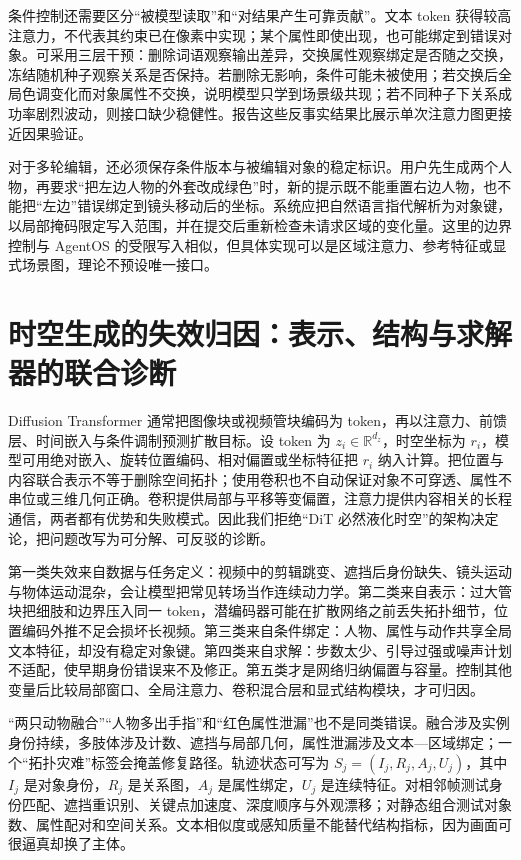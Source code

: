 条件控制还需要区分“被模型读取”和“对结果产生可靠贡献”。文本 token 获得较高注意力，不代表其约束已在像素中实现；某个属性即使出现，也可能绑定到错误对象。可采用三层干预：删除词语观察输出差异，交换属性观察绑定是否随之交换，冻结随机种子观察关系是否保持。若删除无影响，条件可能未被使用；若交换后全局色调变化而对象属性不交换，说明模型只学到场景级共现；若不同种子下关系成功率剧烈波动，则接口缺少稳健性。报告这些反事实结果比展示单次注意力图更接近因果验证。

对于多轮编辑，还必须保存条件版本与被编辑对象的稳定标识。用户先生成两个人物，再要求“把左边人物的外套改成绿色”时，新的提示既不能重置右边人物，也不能把“左边”错误绑定到镜头移动后的坐标。系统应把自然语言指代解析为对象键，以局部掩码限定写入范围，并在提交后重新检查未请求区域的变化量。这里的边界控制与 AgentOS 的受限写入相似，但具体实现可以是区域注意力、参考特征或显式场景图，理论不预设唯一接口。

\section{时空生成的失效归因：表示、结构与求解器的联合诊断}
\label{sec:dit_pathology_confounding}

Diffusion Transformer 通常把图像块或视频管块编码为 token，再以注意力、前馈层、时间嵌入与条件调制预测扩散目标。设 token 为 $z_i\in\mathbb{R}^{d_z}$，时空坐标为 $r_i$，模型可用绝对嵌入、旋转位置编码、相对偏置或坐标特征把 $r_i$ 纳入计算。把位置与内容联合表示不等于删除空间拓扑；使用卷积也不自动保证对象不可穿透、属性不串位或三维几何正确。卷积提供局部与平移等变偏置，注意力提供内容相关的长程通信，两者都有优势和失败模式。因此我们拒绝“DiT 必然液化时空”的架构决定论，把问题改写为可分解、可反驳的诊断。

第一类失效来自数据与任务定义：视频中的剪辑跳变、遮挡后身份缺失、镜头运动与物体运动混杂，会让模型把常见转场当作连续动力学。第二类来自表示：过大管块把细肢和边界压入同一 token，潜编码器可能在扩散网络之前丢失拓扑细节，位置编码外推不足会损坏长视频。第三类来自条件绑定：人物、属性与动作共享全局文本特征，却没有稳定对象键。第四类来自求解：步数太少、引导过强或噪声计划不适配，使早期身份错误来不及修正。第五类才是网络归纳偏置与容量。控制其他变量后比较局部窗口、全局注意力、卷积混合层和显式结构模块，才可归因。

“两只动物融合”“人物多出手指”和“红色属性泄漏”也不是同类错误。融合涉及实例身份持续，多肢体涉及计数、遮挡与局部几何，属性泄漏涉及文本—区域绑定；一个“拓扑灾难”标签会掩盖修复路径。轨迹状态可写为 $S_j=(I_j,R_j,A_j,U_j)$，其中 $I_j$ 是对象身份，$R_j$ 是关系图，$A_j$ 是属性绑定，$U_j$ 是连续特征。对相邻帧测试身份匹配、遮挡重识别、关键点加速度、深度顺序与外观漂移；对静态组合测试对象数、属性配对和空间关系。文本相似度或感知质量不能替代结构指标，因为画面可很逼真却换了主体。

